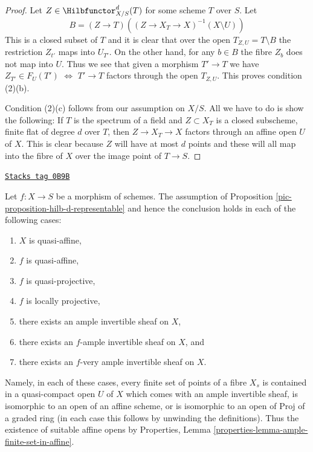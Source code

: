 \begin{proof}
\medskip\noindent
Let $Z \in \Hilbfunctor^d_{X/S}(T)$ for some scheme $T$ over $S$. Let
$$
B = (Z \to T)\left((Z \to X_T \to X)^{-1}(X \setminus U)\right)
$$
This is a closed subset of $T$ and it is clear that over the open
$T_{Z, U} = T \setminus B$ the restriction $Z_{t'}$ maps into $U_{T'}$.
On the other hand, for any $b \in B$ the fibre $Z_b$ does not map
into $U$. Thus we see that given a morphism $T' \to T$ we
have $Z_{T'} \in F_U(T')$ $\Leftrightarrow$ $T' \to T$ factors through
the open $T_{Z, U}$. This proves condition (2)(b).

\medskip\noindent
Condition (2)(c) follows from our assumption on $X/S$. All we have
to do is show the following: If $T$ is the spectrum of a field
and $Z \subset X_T$ is a closed subscheme, finite flat of degree
$d$ over $T$, then $Z \to X_T \to X$ factors through an affine open
$U$ of $X$. This is clear because $Z$ will have at most $d$ points
and these will all map into the fibre of $X$ over the image point
of $T \to S$.
\end{proof}

\begin{remark}
\label{pic-remark-when-proposition-applies}
\href{https://stacks.math.columbia.edu/tag/0B9B}{\texttt{Stacks tag 0B9B}}

Let $f : X \to S$ be a morphism of schemes. The assumption of
Proposition \ref{pic-proposition-hilb-d-representable} and
hence the conclusion holds in each of the following cases:
\begin{enumerate}
\item $X$ is quasi-affine,
\item $f$ is quasi-affine,
\item $f$ is quasi-projective,
\item $f$ is locally projective,
\item there exists an ample invertible sheaf on $X$,
\item there exists an $f$-ample invertible sheaf on $X$, and
\item there exists an $f$-very ample invertible sheaf on $X$.
\end{enumerate}
Namely, in each of these cases, every finite set of points of
a fibre $X_s$ is contained in a quasi-compact open $U$ of $X$
which comes with an ample invertible sheaf, is isomorphic
to an open of an affine scheme, or is isomorphic to an open
of $\text{Proj}$ of a graded ring (in each case this follows
by unwinding the definitions). Thus the existence of suitable
affine opens by
Properties, Lemma \ref{properties-lemma-ample-finite-set-in-affine}.
\end{remark}

